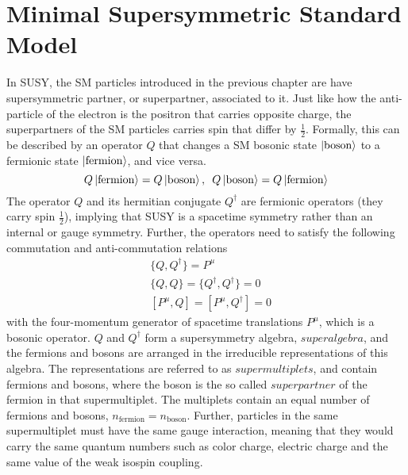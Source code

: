 \section{Minimal Supersymmetric Standard Model}
\noindent\justify
In SUSY, the SM particles introduced in the previous chapter are have supersymmetric partner, or superpartner, associated to it. 
Just like how the anti-particle of the electron is the positron that carries opposite charge, the superpartners of the SM particles carries spin that differ by $\frac{1}{2}$. 
Formally, this can be described by an operator $Q$ that changes a SM bosonic state $\ket{\mathrm{boson}}$ to a fermionic state $\ket{\mathrm{fermion}}$, and vice versa. 
\begin{equation}
Q\ket{\mathrm{fermion}}=Q\ket{\mathrm{boson}}  ,\,\,\,Q\ket{\mathrm{boson}}=Q\ket{\mathrm{fermion}}
\end{equation}
The operator $Q$ and its hermitian conjugate $Q^{\dagger}$ are fermionic operators (they carry spin $\frac{1}{2}$), implying that SUSY is a spacetime symmetry rather than an internal or gauge symmetry. 
Further, the operators need to satisfy the following commutation and anti-commutation relations
\begin{align}
&\{Q,Q^{\dagger}\}=P^{\mu}\\
&\{Q,Q\}=\{Q^{\dagger},Q^{\dagger}\}=0\\
&[P^{\mu},Q]=[P^{\mu},Q^{\dagger}]=0
\end{align} 
with the four-momentum generator of spacetime translations $P^{\mu}$, which is a bosonic operator.
$Q$ and $Q^{\dagger}$ form a supersymmetry algebra, $superalgebra$, and the fermions and bosons are arranged in the irreducible representations of this algebra. 
The representations are referred to as $supermultiplets$, and contain fermions and bosons, where the boson is the so called $superpartner$ of the fermion in that supermultiplet. 
The multiplets contain an equal number of fermions and bosons, $n_{\mathrm{fermion}} = n_{\mathrm{boson}}$. 
Further, particles in the same supermultiplet must have the same gauge interaction, meaning that they would carry the same quantum numbers such as color charge, electric charge and the same value of the weak isospin coupling. 
